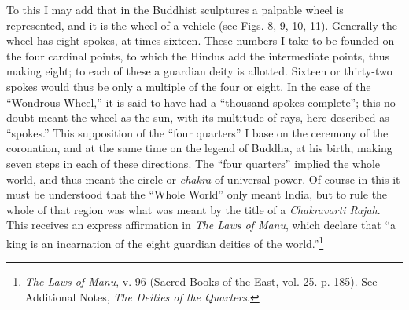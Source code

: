 \documentclass[a4paper, 11pt, oneside, polutonikogreek, english]{article}
\begin{document}
To this I may add that in the Buddhist sculptures a palpable wheel is represented, and it is the wheel of a vehicle (see Figs. 8, 9, 10, 11). Generally the wheel has eight spokes, at times sixteen. These numbers I take to be founded on the four cardinal points, to which the Hindus add the intermediate points, thus making eight; to each of these a guardian deity is allotted. Sixteen or thirty-two spokes would thus be only a multiple of the four or eight. In the case of the ``Wondrous Wheel,'' it is said to have had a ``thousand spokes complete''; this no doubt meant the wheel as the sun, with its multitude of rays, here described as ``spokes.'' This supposition of the ``four quarters'' I base on the ceremony of the coronation, and at the same time on the legend of Buddha, at his birth, making seven steps in each of these directions. The ``four quarters'' implied the whole world, and thus meant the circle or \emph{chakra} of universal power. Of course in this it must be understood that the ``Whole World'' only meant India, but to rule the whole of that region was what was meant by the title of a \emph{Chakravarti Rajah}. This receives an express affirmation in \emph{The Laws of Manu}, which declare that ``a king is an incarnation of the eight guardian deities of the world.''\footnote{\emph{The Laws of Manu}, v. 96 (Sacred Books of the East, vol. 25. p. 185). See Additional Notes, \emph{The Deities of the Quarters}.}
\end{document}
